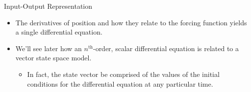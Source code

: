 \begin{frame}
Input-Output Representation
 
\begin{itemize}
 
\item The derivatives of position and how they relate to the forcing function yields a single differential equation.
 
\item We'll see later how an $n^\text{th}$-order, scalar differential equation is related to a 
vector state space model. 



\begin{itemize}
  \item In fact, the state vector be comprised of the values of the initial conditions for the differential 
equation at any particular time.
\end{itemize}


\end{itemize}

\end{frame}
